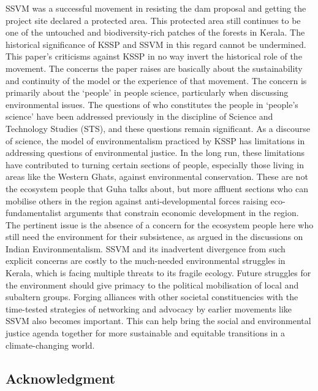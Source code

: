 \documentclass[twoside, 13pt]{article}
\begin{document}
{{{{{SSVM was a successful movement in resisting the dam proposal and getting the project site declared a protected area. This protected area still continues to be one of the untouched and biodiversity-rich patches of the forests in Kerala. The historical significance of KSSP and SSVM in this regard cannot be undermined. This paper's criticisms against KSSP in no way invert the historical role of the movement. The concerns the paper raises are basically about the sustainability and continuity of the model or the experience of that movement. The concern is primarily about the ‘people’ in people science, particularly when discussing environmental issues. The questions of who constitutes the people in ‘people’s science’ have been addressed previously in the discipline of Science and Technology Studies (STS), and these questions remain significant. As a discourse of science, the model of environmentalism practiced by KSSP has limitations in addressing questions of environmental justice. In the long run, these limitations have contributed to turning certain sections of people, especially those living in areas like the Western Ghats, against environmental conservation. These are not the ecosystem people that Guha talks about, but more affluent sections who can mobilise others in the region against anti-developmental forces raising eco-fundamentalist arguments that constrain economic development in the region. The pertinent issue is the absence of a concern for the ecosystem people here who still need the environment for their subsistence, as argued in the discussions on Indian Environmentalism. SSVM and its inadvertent divergence from such explicit concerns are costly to the much-needed environmental struggles in Kerala, which is facing multiple threats to its fragile ecology. Future struggles for the environment should give primacy to the political mobilisation of local and subaltern groups. Forging alliances with other societal constituencies with the time-tested strategies of networking and advocacy by earlier movements like SSVM also becomes important. This can help bring the social and environmental justice agenda together for more sustainable and equitable transitions in a climate-changing world.}

\vspace{-.2cm}

{\fontsize{8}{10}\selectfont\subsection*{Acknowledgment}}

}}}}
\end{document}

